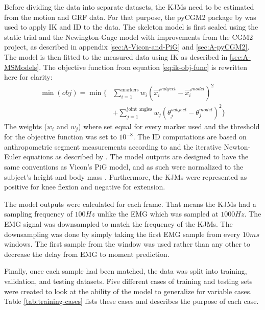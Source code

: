\documentclass[../main.tex]{subfiles}
\begin{document}
Before dividing the data into separate datasets, the \acp{KJM} need to be estimated from the motion and \ac{GRF} data.
For that purpose, the pyCGM2 package by \textcite{Leboeuf2019} was used to apply \ac{IK} and \ac{ID} to the data.
The skeleton model is first scaled using the static trial and the Newington-Gage model with improvements from the CGM2 project, as described in appendix \ref{sec:A-Vicon-and-PiG} and \ref{sec:A-pyCGM2}.
The model is then fitted to the measured data using \ac{IK} as described in \ref{sec:A-MSModels}. 
The objective function from equation \ref{eq:ik-obj-func} is rewritten here for clarity:
\begin{align*}
    \min(obj) = \min\biggl\{ &\sum_{i=1}^{\text{markers}}w_i \left(\Vec{x_i}^{subject}-\Vec{x_i}^{model}\right)^2 \nonumber\\ 
    &+ \sum_{j=1}^{\text{joint angles}}w_j \left( \theta_j^{subject}-\theta_j^{model}\right)^2 \biggr\}
\end{align*}
The weights ($w_i$ and $w_j$) where set equal for every marker used and the threshold for the objective function was set to $10^{-8}$.
The \ac{ID} computations are based on anthropometric segment measurements according to \textcite{Dempster1955} and the iterative Newton-Euler equations as described by \textcite{Dumas2004}.
The model outputs are designed to have the same conventions as Vicon's \ac{PiG} model, and as such were normalized to the subject's height and body mass \cite{Leboeuf2019, viconpig}.
Furthermore, the \acp{KJM} were represented as positive for knee flexion and negative for extension.

The model outputs were calculated for each frame.
That means the \acp{KJM} had a sampling frequency of $100Hz$ unlike the \ac{EMG} which was sampled at $1000Hz$.
The \ac{EMG} signal was downsampled to match the frequency of the \acp{KJM}. 
The downsampling was done by simply taking the first \ac{EMG} sample from every $10ms$ windows. 
The first sample from the window was used rather than any other to decrease the delay from \ac{EMG} to moment prediction. 

Finally, once each sample had been matched, the data was split into training, validation, and testing datasets.
Five different cases of training and testing sets were created to look at the ability of the model to generalize for variable cases.
Table \ref{tab:training-cases} lists these cases and describes the purpose of each case.

\end{document}

